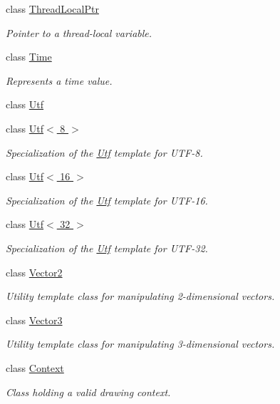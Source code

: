 \begin{DoxyCompactItemize}
class \hyperlink{classsf_1_1_thread_local_ptr}{Thread\-Local\-Ptr}
\begin{DoxyCompactList}\small\item\em Pointer to a thread-\/local variable. \end{DoxyCompactList}\item 
class \hyperlink{classsf_1_1_time}{Time}
\begin{DoxyCompactList}\small\item\em Represents a time value. \end{DoxyCompactList}\item 
class \hyperlink{classsf_1_1_utf}{Utf}
\item 
class \hyperlink{classsf_1_1_utf_3_018_01_4}{Utf$<$ 8 $>$}
\begin{DoxyCompactList}\small\item\em Specialization of the \hyperlink{classsf_1_1_utf}{Utf} template for U\-T\-F-\/8. \end{DoxyCompactList}\item 
class \hyperlink{classsf_1_1_utf_3_0116_01_4}{Utf$<$ 16 $>$}
\begin{DoxyCompactList}\small\item\em Specialization of the \hyperlink{classsf_1_1_utf}{Utf} template for U\-T\-F-\/16. \end{DoxyCompactList}\item 
class \hyperlink{classsf_1_1_utf_3_0132_01_4}{Utf$<$ 32 $>$}
\begin{DoxyCompactList}\small\item\em Specialization of the \hyperlink{classsf_1_1_utf}{Utf} template for U\-T\-F-\/32. \end{DoxyCompactList}\item 
class \hyperlink{classsf_1_1_vector2}{Vector2}
\begin{DoxyCompactList}\small\item\em Utility template class for manipulating 2-\/dimensional vectors. \end{DoxyCompactList}\item 
class \hyperlink{classsf_1_1_vector3}{Vector3}
\begin{DoxyCompactList}\small\item\em Utility template class for manipulating 3-\/dimensional vectors. \end{DoxyCompactList}\item 
class \hyperlink{classsf_1_1_context}{Context}
\begin{DoxyCompactList}\small\item\em Class holding a valid drawing context. \end{DoxyCompactList}\item 

\end{DoxyCompactItemize}
